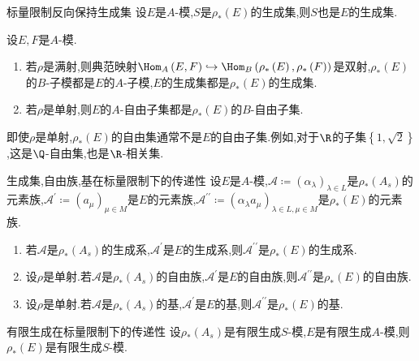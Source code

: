 \begin{proposition}{标量限制反向保持生成集}{}
	设$E$是$A$-模,$S$是$\rho_{\ast}\left(E\right)$的生成集,则$S$也是$E$的生成集.
\end{proposition}

\begin{proposition}{}{}
	设$E,F$是$A$-模.
	\begin{enumerate}
		\item 若$\rho$是满射,则典范映射$\Hom_{A}\left(E,F\right)\hookrightarrow\Hom_{B}\left(\rho_{\ast}\left(E\right),\rho_{\ast}\left(F\right)\right)$是双射,$\rho_{\ast}\left(E\right)$的$B$-子模都是$E$的$A$-子模,$E$的生成集都是$\rho_{\ast}\left(E\right)$的生成集.
		\item 若$\rho$是单射,则$E$的$A$-自由子集都是$\rho_{\ast}\left(E\right)$的$B$-自由子集.
	\end{enumerate}
\end{proposition}

\begin{remark}{}{}
	即使$\rho$是单射,$\rho_{\ast}\left(E\right)$的自由集通常不是$E$的自由子集.例如,对于$\R$的子集$\left\{1,\sqrt{2}\right\}$,这是$\Q$-自由集,也是$\R$-相关集.
\end{remark}

\begin{proposition}{生成集,自由族,基在标量限制下的传递性}{}
	设$E$是$A$-模,$\mathcal{A}\coloneq\left(\alpha_{\lambda}\right)_{\lambda\in L}$是$\rho_{\ast}\left(A_{s}\right)$的元素族,$\mathcal{A}^{\prime}\coloneq\left(a_{\mu}\right)_{\mu\in M}$是$E$的元素族,$\mathcal{A}^{\prime\prime}\coloneq\left(\alpha_{\lambda}a_{\mu}\right)_{\lambda\in L,\mu\in M}$是$\rho_{\ast}\left(E\right)$的元素族.
	\begin{enumerate}
		\item 若$\mathcal{A}$是$\rho_{\ast}\left(A_{s}\right)$的生成系,$\mathcal{A}^{\prime}$是$E$的生成系,则$\mathcal{A}^{\prime\prime}$是$\rho_{\ast}\left(E\right)$的生成系.
		\item 设$\rho$是单射.若$\mathcal{A}$是$\rho_{\ast}\left(A_{s}\right)$的自由族,$\mathcal{A}^{\prime}$是$E$的自由族,则$\mathcal{A}^{\prime\prime}$是$\rho_{\ast}\left(E\right)$的自由族.
		\item 设$\rho$是单射.若$\mathcal{A}$是$\rho_{\ast}\left(A_{s}\right)$的基,$\mathcal{A}^{\prime}$是$E$的基,则$\mathcal{A}^{\prime\prime}$是$\rho_{\ast}\left(E\right)$的基.
	\end{enumerate}
\end{proposition}

\begin{corollary}{有限生成在标量限制下的传递性}{}
	设$\rho_{\ast}\left(A_{s}\right)$是有限生成$S$-模,$E$是有限生成$A$-模,则$\rho_{\ast}\left(E\right)$是有限生成$S$-模.
\end{corollary}

